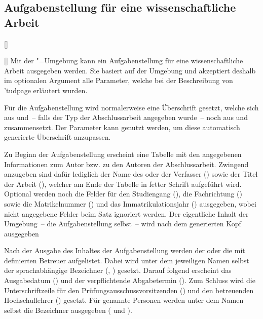 \subsection{Aufgabenstellung für eine wissenschaftliche Arbeit}
\begin{Declaration}{[]}{%
}
\begin{Declaration}{[]}
\printdeclarationlist%
%
%
Mit der "=Umgebung kann ein Aufgabenstellung für eine 
wissenschaftliche Arbeit ausgegeben werden. Sie basiert auf der Umgebung 
 und akzeptiert deshalb im optionalen Argument alle 
Parameter, welche bei der Beschreibung von \Environment'{tudpage} erläutert 
wurden.

Für die Aufgabenstellung wird normalerweise eine Überschrift gesetzt, welche 
sich aus  und~-- falls der Typ der Abschlussarbeit angegeben 
wurde~-- noch aus  und  zusammensetzt. Der 
Parameter  kann genutzt werden, um diese 
automatisch generierte Überschrift anzupassen.

Zu Beginn der Aufgabenstellung erscheint eine Tabelle mit den angegebenen 
Informationen zum Autor bzw. zu den Autoren der Abschlussarbeit. Zwingend 
anzugeben sind dafür lediglich der Name des oder der Verfasser () 
sowie der Titel der Arbeit (), welcher am Ende der Tabelle in 
fetter Schrift aufgeführt wird. Optional werden noch die Felder für den 
Studiengang (), die Fachrichtung () sowie die 
Matrikelnummer () und das Immatrikulationsjahr 
() ausgegeben, wobei nicht angegebene Felder beim Satz 
ignoriert werden. Der eigentliche Inhalt der Umgebung~-- die Aufgabenstellung 
selbst~-- wird nach dem generierten Kopf ausgegeben

Nach der Ausgabe des Inhaltes der Aufgabenstellung werden der oder die mit 
 definierten Betreuer aufgelistet. Dabei wird unter dem 
jeweiligen Namen selbst der sprachabhängige Bezeichner (, 
) gesetzt. Darauf folgend erscheint das Ausgabedatum 
() und der verpflichtende Abgabetermin (). Zum 
Schluss wird die Unterschriftzeile für den Prüfungsausschussvorsitzenden 
() und den betreuenden Hochschullehrer () 
gesetzt. Für genannte Personen werden unter dem Namen selbst die Bezeichner 
ausgegeben ( und ).
\end{Declaration}
\end{Declaration}

